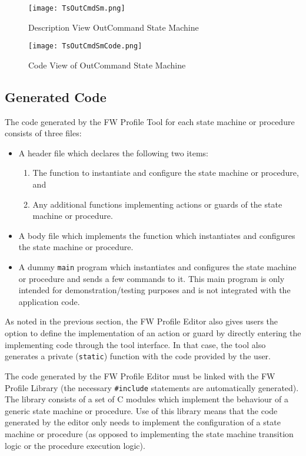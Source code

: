 \documentclass{pnp_article}
\begin{document}
\begin{figure}[H]
 \centering
 \texttt{[image: TsOutCmdSm.png]}
 \caption{Description View OutCommand State Machine}
 \label{fig:TsOutCmdSm}
\end{figure}


\begin{figure}[H]
 \centering
 \texttt{[image: TsOutCmdSmCode.png]}
 \caption{Code View of OutCommand State Machine}
 \label{fig:TsOutCmdSmCode}
\end{figure}

\subsection{Generated Code}
The code generated by the FW Profile Tool for each state machine or procedure consists of three files:

\begin{itemize}
\item A header file which declares the following two items: 
\begin{enumerate}
\item The function to instantiate and configure the state machine or procedure, and
\item Any additional functions implementing actions or guards of the state machine or procedure. 
\end{enumerate}
\item A body file which implements the function which instantiates and configures the state machine or procedure.
\item A dummy \texttt{main} program which instantiates and configures the state machine or procedure and sends a few commands to it. This main program is only intended for demonstration/testing purposes and is not integrated with the application code. 
\end{itemize}

As noted in the previous section, the FW Profile Editor also gives users the option to define the implementation of an action or guard by directly entering the implementing code through the tool interface. In that case, the tool also generates a private (\texttt{static}) function with the code provided by the user. 

The code generated by the FW Profile Editor must be linked with the FW Profile Library (the necessary \texttt{\#include} statements are automatically generated). The library consists of a set of C modules which implement the behaviour of a generic state machine or procedure. Use of this library means that the code generated by the editor only needs to implement the configuration of a state machine or procedure (as opposed to implementing the state machine transition logic or the procedure execution logic). 
\end{document}
